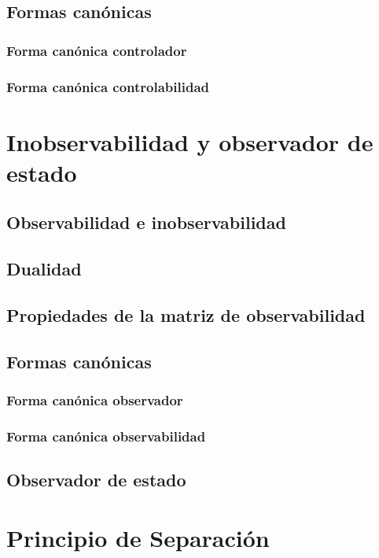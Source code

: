 \documentclass[12pt]{article}
\numberwithin{equation}{subsection}
\begin{document}
\subsection{Formas canónicas}
\subsubsection{Forma canónica controlador}
\subsubsection{Forma canónica controlabilidad}

\newpage
\section{Inobservabilidad y observador de estado}
\subsection{Observabilidad e inobservabilidad}
\subsection{Dualidad}
\subsection{Propiedades de la matriz de observabilidad}
\subsection{Formas canónicas}
\subsubsection{Forma canónica observador}
\subsubsection{Forma canónica observabilidad}
\subsection{Observador de estado}

\newpage
\section{Principio de Separación}
\end{document}

